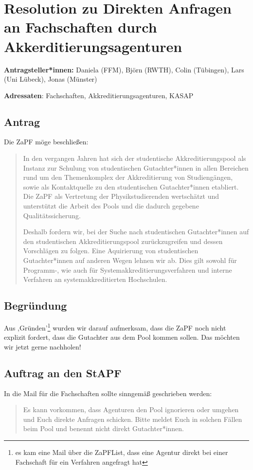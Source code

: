 \documentclass[draft,10pt,oneside]{scrartcl}
\begin{document}
\section*{Resolution zu Direkten Anfragen an Fachschaften durch
Akkerditierungsagenturen}

\textbf{Antragsteller*innen:} Daniela (FFM), Björn (RWTH), Colin (Tübingen),
Lars (Uni Lübeck), Jonas (Münster)

\textbf{Adressaten}: Fachschaften, Akkreditierungsagenturen, KASAP

\subsection*{Antrag}

Die ZaPF möge beschließen:

\begin{quote}
    In den vergangen Jahren hat sich der studentische Akkreditierungspool als
    Instanz zur Schulung von studentischen Gutachter*innen in allen Bereichen
    rund um den Themenkomplex der Akkreditierung von Studiengängen, sowie als
    Kontaktquelle zu den studentischen Gutachter*innen etabliert. Die ZaPF als
    Vertretung der Physikstudierenden wertschätzt und unterstützt die Arbeit
    des Pools und die dadurch gegebene Qualitätssicherung.

    Deshalb fordern wir, bei der Suche nach studentischen Gutachter*innen auf
    den studentischen Akkreditierungspool zurückzugreifen und dessen
    Vorschlägen zu folgen. Eine Aquirierung von studentischen Gutachter*innen
    auf anderen Wegen lehnen wir ab. Dies gilt sowohl für Programm-, wie auch
    für Systemakkreditierungsverfahren und interne Verfahren an
    systemakkreditierten Hochschulen.
\end{quote}

\subsection*{Begründung}
Aus ,Gründen'\footnote{es kam eine Mail über die ZaPFList, dass eine Agentur
direkt bei einer Fachschaft für ein Verfahren angefragt hat } wurden wir darauf
aufmerksam, dass die ZaPF noch nicht explizit fordert, dass die Gutachter aus
dem Pool kommen sollen. Das möchten wir jetzt gerne nachholen!

\subsection*{Auftrag an den StAPF}
In die Mail für die Fachschaften sollte sinngemäß geschrieben werden:

\begin{quote}
    Es kann vorkommen, dass Agenturen den Pool ignorieren oder umgehen und Euch
    direkte Anfragen schicken. Bitte meldet Euch in solchen Fällen beim Pool
    und benennt nicht direkt Gutachter*innen.
\end{quote}
\end{document}
